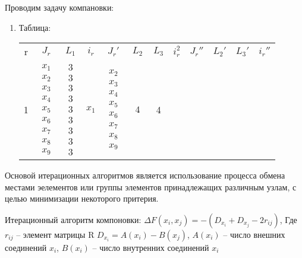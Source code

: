 \documentclass{article}
\begin{document}
	Проводим задачу компановки:
	\begin{enumerate}
		\item Таблица:

			\begin{tabular}{cccccccccccc}
				r & $J_r$ & $L_1$ & $i_r$ & $J_r'$ & $L_2$ & $L_3$ & $i_r^2$ & $J_r''$ & $L_2'$ & $L_3'$ & $i_r''$\\
				1 &
				$
				\begin{array}{c}
				x_1 \\ x_2 \\ x_3 \\ x_4 \\ x_5 \\ x_6 \\ x_7 \\ x_8 \\ x_9
				\end{array}
				$
				&
				$
				\begin{array}{c}
				3 \\ 3 \\ 3 \\ 3 \\ 3 \\ 3 \\ 3 \\ 3 \\ 3 
				\end{array}
				$
				& $x_1$ & 
				$
				\begin{array}{c}
				x_2 \\ x_3 \\ x_4 \\ x_5 \\ x_6 \\ x_7 \\ x_8 \\ x_9
				\end{array}
				$
				&
				$
				\begin{array}{c}
				4
				\end{array}
				$ & 4
			\end{tabular}
	\end{enumerate}

	Основой итерационных алгоритмов является использование процесса обмена местами эелементов или группы элементов принадлежащих различным узлам, с целью минимизации некоторого притерия.
	
	Итерационный алгоритм компоновки:
	$
	\Delta F (x_i, x_j) = - (D_{x_i} + D_{x_j} - 2 r_{ij})
	$, Где $r_{ij}$ -- элемент матрицы R
	$D_{x_i} = A (x_i) - B (x_j)$, $A(x_i)$ -- число внешних соединений $x_i$, $B(x_i)$ -- число внутренних соединений $x_i$
	
\end{document}
